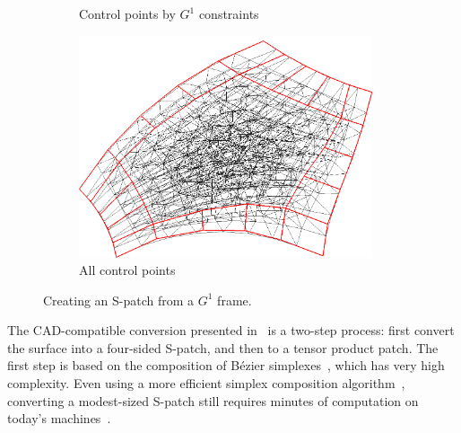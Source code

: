 \documentclass[9pt,academicons]{article}
\begin{document}
\begin{figure}
{\begin{subfigure}{0.32\textwidth}
      \caption{Control points by $G^1$ constraints}
      \label{fig:spatch-cnet-ribbon}
    \end{subfigure}
    \hfill
    \begin{subfigure}{0.32\textwidth}
      \centering
      \includegraphics[width = 0.95\textwidth]{images/5-5-cnet-full.png}
      \caption{All control points}
      \label{fig:spatch-cnet-full}
    \end{subfigure}
  }
  \caption{Creating an S-patch from a $G^1$ frame.}
  \label{fig:spatch}
\end{figure}

The CAD-compatible conversion presented in~\cite{Loop:1989} is a two-step process:
first convert the surface into a
four-sided S-patch, and then to a tensor product patch. The first step is based on the
composition of B\'ezier simplexes~\cite{DeRose:1988}, which has very high complexity.
Even using a more efficient simplex composition
algorithm~\cite{DeRose:1993}, converting a modest-sized S-patch
still requires minutes of computation on today's machines~\cite{Salvi:2019:WAIT}.
\end{document}
